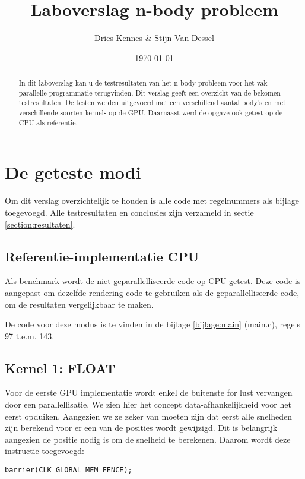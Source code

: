 \documentclass[a4paper]{article}
\title{Laboverslag n-body probleem}
\author{Dries Kennes \& Stijn Van Dessel}
\date{\today{}}
\begin{document}
\maketitle

\begin{abstract}
In dit laboverslag kan u de testresultaten van het n-body probleem voor het vak parallelle programmatie terugvinden. Dit verslag geeft een overzicht van de bekomen testresultaten. 
De testen werden uitgevoerd met een verschillend aantal body's en met verschillende soorten kernels op de GPU. Daarnaast werd de opgave ook getest op de CPU als referentie.
\end{abstract}

\section{De geteste modi}

Om dit verslag overzichtelijk te houden is alle code met regelnummers als bijlage toegevoegd. Alle testresultaten en conclusies zijn verzameld in sectie \ref{section:resultaten}.

\subsection{Referentie-implementatie CPU}

Als benchmark wordt de niet geparallelliseerde code op CPU getest. Deze code is aangepast om dezelfde rendering code te gebruiken als de geparallelliseerde code, om de resultaten vergelijkbaar te maken.

De code voor deze modus is te vinden in de bijlage \ref{bijlage:main} (main.c), regels 97 t.e.m. 143.

\subsection{Kernel 1: FLOAT}

Voor de eerste GPU implementatie wordt enkel de buitenste for lust vervangen door een parallellisatie. We zien hier het concept data-afhankelijkheid voor het eerst opduiken.
Aangezien we ze zeker van moeten zijn dat eerst alle snelheden zijn berekend voor er een van de posities wordt gewijzigd. Dit is belangrijk aangezien de positie nodig is om de snelheid te berekenen. Daarom wordt deze instructie toegevoegd:

\begin{lstlisting}
barrier(CLK_GLOBAL_MEM_FENCE);
\end{lstlisting}
\end{document}

